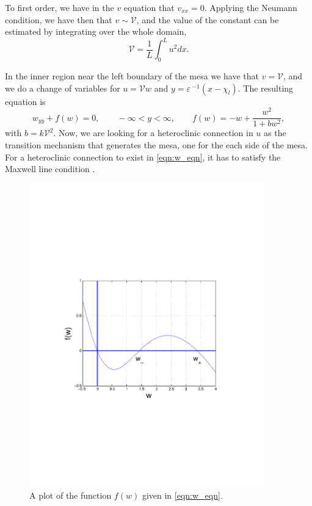\documentclass[a4paper,10pt]{article}
\newcommand{\Ep}{\ensuremath{\varepsilon\,}}
\newcommand{\VV}{\ensuremath{\mathcal{V}}}
\begin{document}
To first order, we have in the $v$ equation that $v_{xx}=0$. Applying the Neumann condition, we have then that $v\sim\VV$, and the value of the constant can be estimated by integrating over the whole domain,
% 
\begin{equation}
\label{eqn:v_first_order}
  \VV = \frac{1}{L}\int_0^Lu^2dx.
\end{equation}
% 

In the inner region near the left boundary of the mesa we have that $v=\VV$, and we do a change of variables for $u=\VV w$ and $y=\Ep^{-1}(x-\chi_l)$. The resulting equation is
% 
\begin{equation}
\label{eqn:w_eqn}
  w_{yy}+f(w)=0, \qquad -\infty<y<\infty,\qquad f(w) = -w + \frac{w^2}{1+bw^2},
\end{equation}
% 
with $b = k\VV^2$. Now, we are looking for a heteroclinic connection in $u$ as the transition mechanism that generates the mesa, one for the each side of the mesa. For a heteroclinic connection to exist in \ref{eqn:w_eqn}, it has to satisfy the Maxwell line condition \cite{maxwell1994}.
% 
\begin{figure}[htb]
\begin{center}
\includegraphics[width=4in]{f_of_w}
\caption{A plot of the function $f(w)$ given in \eqref{eqn:w_eqn}.}
\label{fig:f(w)}
\end{center}
\end{figure}
% 
\end{document}
